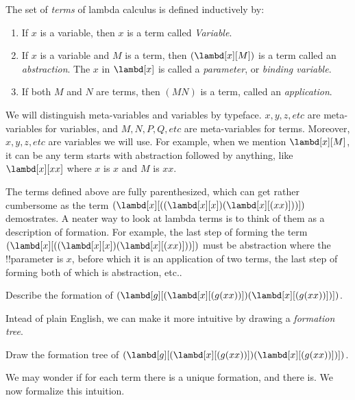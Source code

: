 \documentclass[../../../include/open-logic-section]{subfiles}
\begin{document}

\begin{defn}[Terms] 
The set of \emph{terms} of lambda calculus is defined inductively by:
\begin{enumerate}
  \item {} If $x$ is a variable, then $x$ is a
    term called \emph{Variable}.
  \item {} If $x$ is a variable and $M$ is a term, then $(\lambd[x][M])$ is
    a term called an \emph{abstraction}. The $x$ in
    $\lambd[x]$ is called a \emph{parameter}, or \emph{binding variable}.
  \item {} If both $M$ and $N$ are terms, then
    $(MN)$ is a term, called an \emph{application}.
\end{enumerate}
\end{defn}

We will distinguish meta-variables and variables by typeface. $x, y,
z, etc$ are meta-variables for variables, and $M, N, P, Q, etc$ are
meta-variables for terms. Moreover,  $x, y, z, etc$ are variables
we will use. For example, when we mention $\lambd[x][M]$, it can be
any term starts with abstraction followed by anything, like
$\lambd[x][x x]$ where $x$ is $x$ and $M$ is $x x$.


The terms defined above are fully parenthesized, which can get rather
cumbersome as the term $(\lambd[x][((\lambd[x][x])(\lambd[x][(xx)]))])$ demostrates. A neater way to look at lambda terms is to think of them as
a description of formation. For
example, the last step of forming the term $(\lambd[x][((\lambd[x][x])(\lambd[x][(xx)]))])$
must be abstraction where the !!{parameter} is $x$, before which it is
an application of two terms, the last step of forming both of which is
abstraction, etc.. 

\begin{prob}
  Describe the formation of $(\lambd[g][(\lambd[x][(g (x x))]) (\lambd[x][(g (x x))])])$.
\end{prob}

Intead of plain English, we can make it more intuitive by drawing a
\emph{formation tree}.

\begin{prob}
  Draw the formation tree of $(\lambd[g][(\lambd[x][(g (x x))]) (\lambd[x][(g (x x))])])$.
\end{prob}

We may wonder if for each term there is a unique formation, and there
is. We now formalize this intuition.
\end{document}
